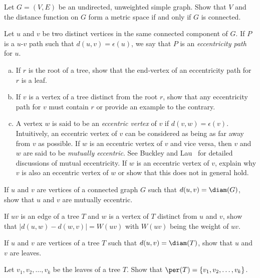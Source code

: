 \begin{problem}
\item Let $G = (V,E)$ be an undirected, unweighted simple graph. Show
  that $V$ and the distance function on $G$
  form a metric space if and only if $G$ is connected.

\item Let $u$ and $v$ be two distinct vertices in the same connected
  component of $G$. If $P$ is a $u$-$v$ path such that
  $d(u,v) = \epsilon(u)$, we say that $P$ is an
  \emph{eccentricity path} for $u$.
  \begin{enumerate}[(a)]
  \item If $r$ is the root of a tree, show that the end-vertex of an
    eccentricity path for $r$ is a leaf.

  \item If $v$ is a vertex of a tree distinct from the root $r$, show
    that any eccentricity path for $v$ must contain $r$ or provide an
    example to the contrary.

  \item A vertex $w$ is said to be an
    \emph{eccentric vertex} of $v$ if
    $d(v,w) = \epsilon(v)$. Intuitively, an eccentric vertex of $v$
    can be considered as being as far away from $v$ as possible. If
    $w$ is an eccentric vertex of $v$ and vice versa, then $v$ and $w$
    are said to be
    \emph{mutually eccentric}. See Buckley
    and Lau~\cite{BuckleyLau2003} for detailed discussions of mutual
    eccentricity. If $w$ is an eccentric vertex of $v$, explain why
    $v$ is also an eccentric vertex of $w$ or show that this does not
    in general hold.
  \end{enumerate}

\item If $u$ and $v$ are vertices of a connected graph $G$ such that
  $d(u,v) = \diam(G)$, show that $u$ and $v$ are mutually eccentric.

\item If $uv$ is an edge of a tree $T$ and $w$ is a vertex of $T$
  distinct from $u$ and $v$, show that $|d(u,w) - d(w,v)| = W(uv)$
  with $W(uv)$ being the weight of $uv$.

\item If $u$ and $v$ are vertices of a tree $T$ such that
  $d(u,v) = \diam(T)$, show that $u$ and $v$ are leaves.

\item Let $v_1, v_2, \dots, v_k$ be the leaves of a tree $T$. Show
  that $\per(T) = \{v_1, v_2, \dots, v_k\}$.


\end{problem}
